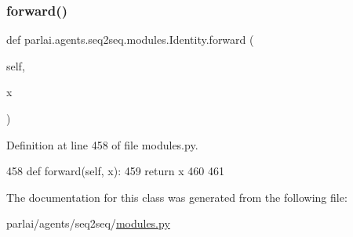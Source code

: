 \subsubsection{\texorpdfstring{forward()}{forward()}}
{\footnotesize\ttfamily def parlai.\+agents.\+seq2seq.\+modules.\+Identity.\+forward (\begin{DoxyParamCaption}\item[{}]{self,  }\item[{}]{x }\end{DoxyParamCaption})}



Definition at line 458 of file modules.\+py.


\begin{DoxyCode}
458     \textcolor{keyword}{def }forward(self, x):
459         \textcolor{keywordflow}{return} x
460 
461 
\end{DoxyCode}


The documentation for this class was generated from the following file\+:\begin{DoxyCompactItemize}
\item 
parlai/agents/seq2seq/\hyperlink{parlai_2agents_2seq2seq_2modules_8py}{modules.\+py}\end{DoxyCompactItemize}
